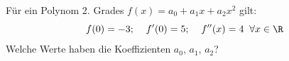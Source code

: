 \begin{ExerciseBlock}
Für ein Polynom 2. Grades $f(x) = a_0 + a_1 x + a_2 x^2$ gilt: \[ f(0) = -3; \;\;\;\; f'(0) = 5; \;\;\;\; f''(x) = 4 \;\; \forall x \in \R \] 
Welche Werte haben die Koeffizienten $a_0$, $a_1$, $a_2$?

\end{ExerciseBlock}
